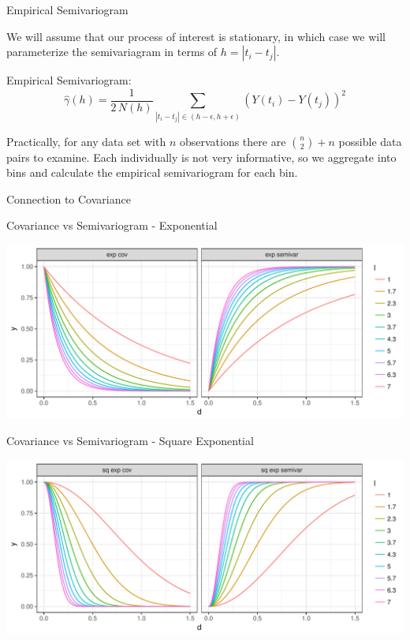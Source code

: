 \documentclass[11pt,ignorenonframetext,]{beamer}
\begin{document}
\begin{frame}[t]{Empirical Semivariogram}

We will assume that our process of interest is stationary, in which case
we will parameterize the semivariagram in terms of \(h = |t_i - t_j|\).

\vspace{3mm}

Empirical Semivariogram:
\[ \hat{\gamma}(h) = \frac{1}{2 \, N(h)} \sum_{|t_i-t_j| \in (h-\epsilon,h+\epsilon)} (Y(t_i) - Y(t_j))^2 \]

\pause

Practically, for any data set with \(n\) observations there are
\({n \choose 2} + n\) possible data pairs to examine. Each individually
is not very informative, so we aggregate into bins and calculate the
empirical semivariogram for each bin.

\end{frame}

\begin{frame}{Connection to Covariance}

\end{frame}

\begin{frame}{Covariance vs Semivariogram - Exponential}

\includegraphics{Lec13_files/figure-beamer/unnamed-chunk-2-1.pdf}

\end{frame}

\begin{frame}{Covariance vs Semivariogram - Square Exponential}

\includegraphics{Lec13_files/figure-beamer/unnamed-chunk-3-1.pdf}

\end{frame}
\end{document}
